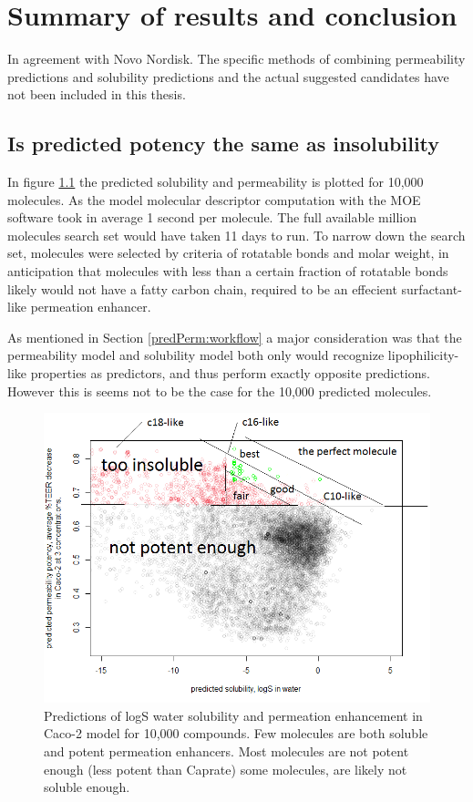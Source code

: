 \chapter{Summary of results and conclusion}

In agreement with Novo Nordisk. The specific methods of combining permeability predictions and solubility predictions and the actual suggested candidates have not been included in this thesis.


\section{Is predicted potency the same as insolubility}
In figure \ref{predictionsCombined} the predicted solubility and permeability is plotted for 10,000 molecules. As the model molecular descriptor computation with the MOE software took in average 1 second per molecule. The full available million molecules search set would have taken 11 days to run.  To narrow down the search set, molecules were selected by criteria of rotatable bonds and molar weight, in anticipation that molecules with less than a certain fraction of rotatable bonds likely would not have a fatty carbon chain, required to be an effecient surfactant-like permeation enhancer.

As mentioned in Section \ref{predPerm:workflow} a major consideration was that the permeability model and solubility model both only would recognize lipophilicity-like properties as predictors, and thus perform exactly opposite predictions. However this is seems not to be the case for the 10,000 predicted molecules. 


\begin{figure}[!htbp]
\includegraphics[width=\textwidth,height=\textheight,keepaspectratio]{graphics/screened_molecules2.png}
\caption{Predictions of logS water solubility and permeation enhancement in Caco-2 model for 10,000 compounds. Few molecules are both soluble and potent permeation enhancers. Most molecules are not potent enough (less potent than Caprate) some molecules, are likely not soluble enough. }
\label{predictionsCombined}
\end{figure}



